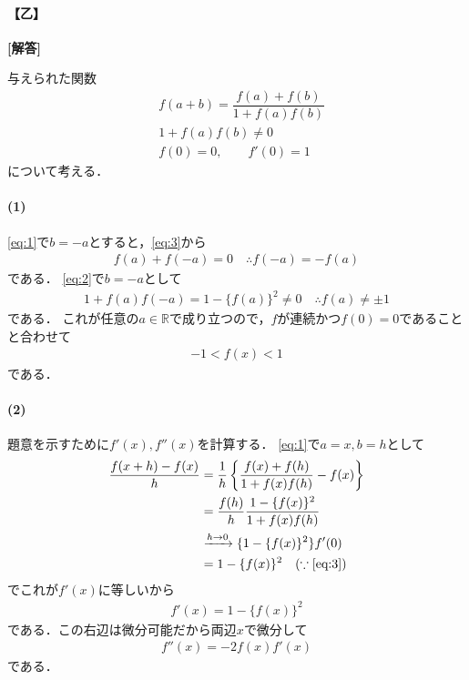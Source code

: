 \documentclass[../../main.tex]{subfiles}
\begin{document}
\begin{oframed}
  
\end{oframed}

\paragraph{【乙】}

{\bf [解答]}

与えられた関数
\begin{align}
  & f(a+b)=\dfrac{f(a)+f(b)}{1+f(a)f(b)} \label{eq:1}\\
  & 1+f(a)f(b)\ne0 \label{eq:2} \\
  & f(0)=0,\qquad f'(0)=1 \label{eq:3}
\end{align}
について考える．

\paragraph{(1)}

\cref{eq:1}で$b=-a$とすると，\cref{eq:3}から
\begin{align}
  f(a)+f(-a)=0 \quad \therefore f(-a) = -f(a) \label{eq:4}
\end{align}
である．
\cref{eq:2}で$b=-a$として
\begin{align}
  1+f(a)f(-a)=1-\{f(a)\}^2 \ne 0 \quad \therefore f(a) \neq \pm 1 \label{eq:5}
\end{align}
である．
これが任意の$a\in\mathbb{R}$で成り立つので，$f$が連続かつ$f(0)=0$であることと合わせて
\begin{align}
  -1<f(x)<1
\end{align}
である．

\paragraph{(2)}

題意を示すために$f'(x),f''(x)$を計算する．
\cref{eq:1}で$a=x,b=h$として
\begin{align}
  \begin{split}
    \dfrac{f(x+h)-f(x)}{h}
    &=\dfrac{1}{h}\left\{\dfrac{f(x)+f(h)}{1+f(x)f(h)}-f(x)\right\}\\
    &=\dfrac{f(h)}{h}\dfrac{1-\{f(x)\}^2}{1+f(x)f(h)}\\
    &\xrightarrow{h\to 0} \{1-\{f(x)\}^2\}f'(0) \\
    &= 1-\{f(x)\}^2 \quad (\because\text{\cref{eq:3}})
  \end{split}
\end{align}
でこれが$f'(x)$に等しいから
\begin{align}
  f'(x)=1-\{f(x)\}^2 \label{eq:6}
\end{align}
である．この右辺は微分可能だから両辺$x$で微分して
\begin{align}
  f''(x) = -2f(x)f'(x) \label{eq:7}
\end{align}
である．
\end{document}
